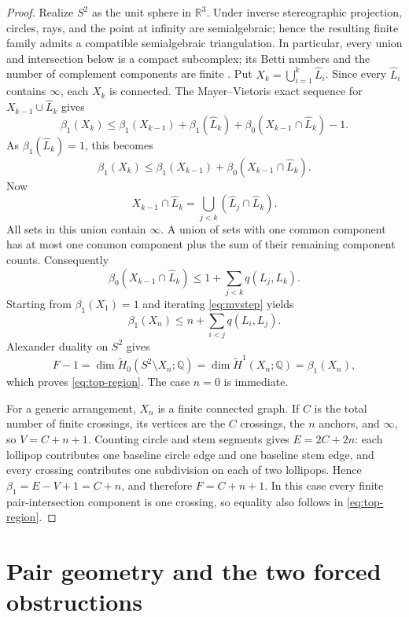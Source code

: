\documentclass[11pt]{article}
\theoremstyle{plain}
\theoremstyle{definition}
\theoremstyle{remark}
\newcommand{\R}{\mathbb R}
\newcommand{\Q}{\mathbb Q}
\newcommand{\1}{\mathbf 1}
\newcommand{\betti}{\beta}
\begin{document}
\begin{proof}
Realize $S^2$ as the unit sphere in $\R^3$.  Under inverse stereographic
projection, circles, rays, and the point at infinity are semialgebraic; hence
the resulting finite family admits a compatible semialgebraic triangulation.
In particular, every union and intersection below is a compact subcomplex;
its Betti numbers and the number of complement components are finite
\cite{BCR}.  Put
$X_k=\bigcup_{i=1}^k\widehat L_i$.  Since every $\widehat L_i$ contains
$\infty$, each $X_k$ is connected.  The Mayer--Vietoris exact sequence for
$X_{k-1}\cup\widehat L_k$ gives
\[
 \betti_1(X_k)\leq \betti_1(X_{k-1})+\betti_1(\widehat L_k)
 +\betti_0(X_{k-1}\cap\widehat L_k)-1.
\]
As $\betti_1(\widehat L_k)=1$, this becomes
\begin{equation}\label{eq:mvstep}
 \betti_1(X_k)\leq \betti_1(X_{k-1})+
 \betti_0(X_{k-1}\cap\widehat L_k).
\end{equation}
Now
\[
 X_{k-1}\cap\widehat L_k
 =\bigcup_{j<k}(\widehat L_j\cap\widehat L_k).
\]
All sets in this union contain $\infty$.  A union of sets with one common
component has at most one common component plus the sum of their remaining
component counts.  Consequently
\[
 \betti_0(X_{k-1}\cap\widehat L_k)
 \leq1+\sum_{j<k}q(L_j,L_k).
\]
Starting from $\betti_1(X_1)=1$ and iterating \eqref{eq:mvstep} yields
\begin{equation}\label{eq:b1-bound}
 \betti_1(X_n)\leq n+\sum_{i<j}q(L_i,L_j).
\end{equation}
Alexander duality on $S^2$ \cite[Section~3.3]{Hatcher} gives
\[
 F-1=\dim \widetilde H_0(S^2\setminus X_n;\Q)
 =\dim \widetilde H^1(X_n;\Q)=\betti_1(X_n),
\]
which proves \eqref{eq:top-region}.  The case $n=0$ is immediate.

For a generic arrangement, $X_n$ is a finite connected graph.  If $C$ is the
total number of finite crossings, its vertices are the $C$ crossings, the $n$
anchors, and $\infty$, so $V=C+n+1$.  Counting circle and stem segments gives
$E=2C+2n$: each lollipop contributes one baseline circle edge and one baseline
stem edge, and every crossing contributes one subdivision on each of two
lollipops.  Hence
$\betti_1=E-V+1=C+n$, and therefore $F=C+n+1$.  In this case every finite
pair-intersection component is one crossing, so equality also follows in
\eqref{eq:top-region}.
\end{proof}

\section{Pair geometry and the two forced obstructions}\label{sec:geometry}
\end{document}
